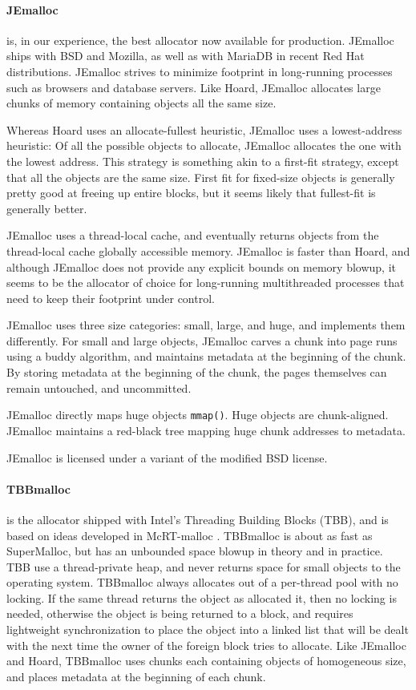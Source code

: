 \documentclass[pldi]{sigplanconf-pldi15}
\newcommand{\code}[1]{\texttt{#1}}
\begin{document}
{\paragraph{JEmalloc}} \cite{Evans06} is, in our experience, the best
allocator now available for production.  JEmalloc ships with BSD and
Mozilla, as well as with MariaDB in recent Red Hat distributions.
JEmalloc strives to minimize footprint in long-running processes such
as browsers and database servers.  Like Hoard, JEmalloc allocates
large chunks of memory containing objects all the same size.  

Whereas Hoard uses an allocate-fullest heuristic, JEmalloc uses a
lowest-address heuristic: Of all the possible objects to allocate,
JEmalloc allocates the one with the lowest address.  This strategy is
something akin to a first-fit strategy, except that all the objects
are the same size.  First fit for fixed-size objects is generally
pretty good at freeing up entire blocks, but it seems likely that
fullest-fit is generally better.

JEmalloc uses a thread-local cache, and eventually returns objects
from the thread-local cache globally accessible memory.  JEmalloc is
faster than Hoard, and although JEmalloc does not provide any explicit
bounds on memory blowup, it seems to be the allocator of choice for
long-running multithreaded processes that need to keep their footprint
under control.

JEmalloc uses three size categories: small, large, and huge, and
implements them differently. For small and large objects, JEmalloc
carves a chunk into page runs using a buddy algorithm, and maintains
metadata at the beginning of the chunk.  By storing metadata at the
beginning of the chunk, the pages themselves can remain untouched, and
uncommitted.

JEmalloc directly maps huge objects \code{mmap()}.  Huge objects are
chunk-aligned.  JEmalloc maintains a red-black tree mapping huge chunk
addresses to metadata.

JEmalloc is licensed under a variant of the modified BSD license.

{\paragraph{TBBmalloc}} \cite{KukanovVo07} is the allocator shipped
with Intel's Threading Building Blocks (TBB), and is based on ideas
developed in McRT-malloc \cite{HudsonSaAd06}.  TBBmalloc is about as
fast as SuperMalloc, but has an unbounded space blowup in theory and
in practice.  TBB use a thread-private heap, and never returns space
for small objects to the operating system.  TBBmalloc always allocates
out of a per-thread pool with no locking.  If the same thread returns
the object as allocated it, then no locking is needed, otherwise the
object is being returned to a  block, and requires
lightweight synchronization to place the object into a linked list
that will be dealt with the next time the owner of the foreign block
tries to allocate.  Like JEmalloc and Hoard, TBBmalloc uses chunks
each containing objects of homogeneous size, and places metadata at
the beginning of each chunk.
\end{document}
